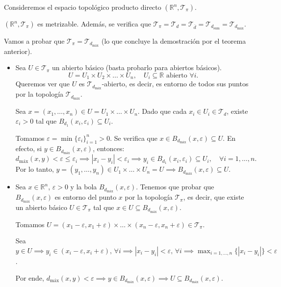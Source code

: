 Consideremos el espacio topológico producto directo $(\mathbb{R}^n, \mathcal{T}_\pi)$.

\begin{teo}
$(\mathbb{R}^n, \mathcal{T}_\pi)$ es metrizable. Además, se verifica que $\mathcal{T}_\pi = \mathcal{T}_d = \mathcal{T}_{\overline{d}} = \mathcal{T}_{d_{\text{sum}}} = \mathcal{T}_{d_{\text{máx}}}$.
\end{teo}

\begin{dem}
Vamos a probar que $\mathcal{T}_\pi = \mathcal{T}_{d_{\text{máx}}}$ (lo que concluye la demostración por el teorema anterior).

\begin{itemize}  \item[$\boxed{\subseteq}$] Sea $U \in \mathcal{T}_\pi$ un abierto básico (basta probarlo para abiertos básicos).
\[
U = U_1 \times U_2 \times \dots \times U_n, \quad U_i \subseteq \mathbb{R} \text{ abierto } \forall i.
\]
Queremos ver que $U$ es $\mathcal{T}_{d_{\text{máx}}}$-abierto, es decir, es entorno de todos sus puntos por la topología $\mathcal{T}_{d_{\text{máx}}}$.

Sea $x = (x_1, \dots, x_n) \in U = U_1 \times \dots \times U_n$. Dado que cada $x_i \in U_i \in \mathcal{T}_d$, existe $\varepsilon_i > 0$ tal que $B_{d_1}(x_i, \varepsilon_i) \subseteq U_i$.

Tomamos $\varepsilon = \min\{\varepsilon_i\}_{i=1}^n > 0$. Se verifica que $x \in B_{d_{\text{máx}}}(x, \varepsilon) \subseteq U$. En efecto, si $y \in B_{d_{\text{máx}}}(x, \varepsilon)$, entonces:
\[
d_{\text{máx}}(x,y) < \varepsilon \le \varepsilon_i \implies |x_i - y_i| < \varepsilon_i \implies y_i \in B_{d_1}(x_i, \varepsilon_i) \subseteq U_i, \quad \forall i=1,\dots,n.
\]
Por lo tanto, $y = (y_1, \dots, y_n) \in U_1 \times \dots \times U_n = U \implies B_{d_{\text{máx}}}(x, \varepsilon) \subseteq U$.

\item[$\boxed{\supseteq}$] Sea $x \in \mathbb{R}^n$, $\varepsilon > 0$ y la bola $B_{d_{\text{máx}}}(x, \varepsilon)$. Tenemos que probar que $B_{d_{\text{máx}}}(x, \varepsilon)$ es entorno del punto $x$ por la topología $\mathcal{T}_\pi$, es decir, que existe un abierto básico $U \in \mathcal{T}_\pi$ tal que $x \in U \subseteq B_{d_{\text{máx}}}(x, \varepsilon)$.

Tomamos $U = (x_1 - \varepsilon, x_1 + \varepsilon) \times \dots \times (x_n - \varepsilon, x_n + \varepsilon) \in \mathcal{T}_\pi$.

Sea $y \in U \implies y_i \in (x_i - \varepsilon, x_i + \varepsilon), \, \forall i \implies |x_i - y_i| < \varepsilon, \, \forall i \implies \max_{i=1,\dots,n}\{|x_i - y_i|\} < \varepsilon$.

Por ende, $d_{\text{máx}}(x,y) < \varepsilon \implies y \in B_{d_{\text{máx}}}(x, \varepsilon) \implies U \subseteq B_{d_{\text{máx}}}(x, \varepsilon)$.\
\end{itemize}
\end{dem}

